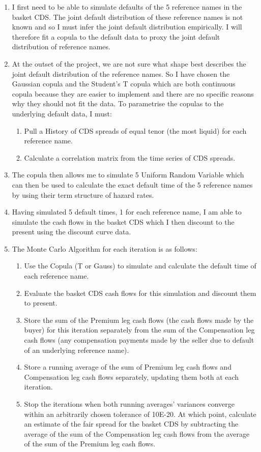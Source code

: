 \documentclass{report}
\theoremstyle{plain}
\theoremstyle{definition}
\begin{document}
\begin{enumerate}
\item I first need to be able to simulate defaults of the 5 reference names in the basket CDS. The joint default distribution of these reference names is not known and so I must infer the joint default distribution empirically. I will therefore fit a copula to the default data to proxy the joint default distribution of reference names.
\item At the outset of the project, we are not sure what shape best describes the joint default distribution of the reference names. So I have chosen the Gaussian copula and the Student's T copula which are both continuous copula because they are easier to implement and there are no specific reasons why they should not fit the data. To parametrise the copulas to the underlying default data, I must: 
	\begin{enumerate}
		\item Pull a History of CDS spreads of equal tenor (the most liquid) for each reference name.
		\item Calculate a correlation matrix from the time series of CDS spreads.
	\end{enumerate}
\item The copula then allows me to simulate 5 Uniform Random Variable which can then be used to calculate the exact default time of the 5 reference names by using their term structure of hazard rates.
\item Having simulated 5 default times, 1 for each reference name, I am able to simulate the cash flows in the basket CDS which I then discount to the present using the discount curve data.
\item The Monte Carlo Algorithm for each iteration is as follows: 
	\begin{enumerate}
		\item Use the Copula (T or Gauss) to simulate and calculate the default time of each reference name.
		\item Evaluate the basket CDS cash flows for this simulation and discount them to present. 
		\item Store the sum of the Premium leg cash flows (the cash flows made by the buyer) for this iteration separately from the sum of the Compensation leg cash flows (any compensation payments made by the seller due to default of an underlying reference name).
		\item Store a running average of the sum of Premium leg cash flows and Compensation leg cash flows separately, updating them both at each iteration.
		\item Stop the iterations when both running averages' variances converge within an arbitrarily chosen tolerance of 10E-20. At which point, calculate an estimate of the fair spread for the basket CDS by subtracting the average of the sum of the Compensation leg cash flows from the average of the sum of the Premium leg cash flows.
	\end{enumerate}
\end{enumerate}
\end{document}

